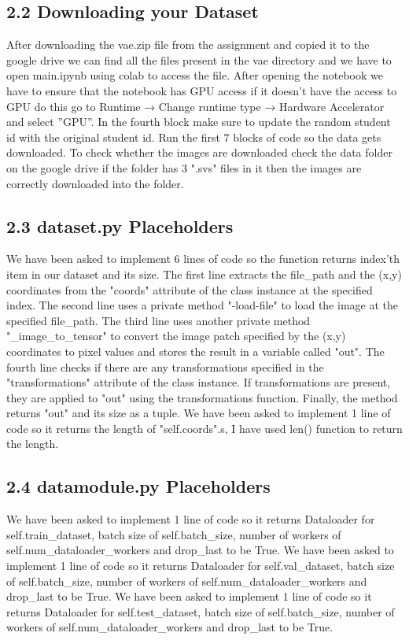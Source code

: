 \documentclass{article}
\begin{document}
    
   \subsection*{2.2 Downloading your Dataset} 
     \newline After downloading the vae.zip file from the assignment and copied it to the google drive we can find all the files present in the vae directory and we have to open main.ipynb using colab to access the file.
     After opening the notebook we have to ensure that the notebook has GPU access if it doesn't have the access to GPU do this go to Runtime → Change runtime type → Hardware Accelerator and select ”GPU”.
     In the fourth block make sure to update the random student id with the original student id. Run the first 7 blocks of code so the data gets downloaded. To check whether the images are downloaded check the data folder on the google drive if the folder has 3 ".svs" files in it then the images are correctly downloaded into the folder.
    \subsection*{2.3 dataset.py Placeholders }
     \newline We have been asked to implement 6 lines of code so the function returns index'th item in our dataset and its size.
     The first line extracts the file\_path and the (x,y) coordinates from the "coords" attribute of the class instance at the specified index.
     The second line uses a private method "-load-file" to load the image at the specified file\_path.
     The third line uses another private method "\_image\_to\_tensor" to convert the image patch specified by the (x,y) coordinates to pixel values and stores the result in a variable called "out".
     The fourth line checks if there are any transformations specified in the "transformations" attribute of the class instance. If transformations are present, they are applied to "out" using the transformations function.
     Finally, the method returns "out" and its size as a tuple.
     \newline We have been asked to implement 1 line of code so it returns the length of "self.coords".s, I have used len() function to return the length. 
      
     \subsection*{2.4 datamodule.py Placeholders } 
 \newline We have been asked to implement 1 line of code so it returns Dataloader for self.train\_dataset, batch size of self.batch\_size, number of workers of self.num\_dataloader\_workers and drop\_last to be True.
 \newline We have been asked to implement 1 line of code so it returns Dataloader for self.val\_dataset, batch size of self.batch\_size, number of workers of self.num\_dataloader\_workers and drop\_last to be True.
 \newline We have been asked to implement 1 line of code so it returns Dataloader for self.test\_dataset, batch size of self.batch\_size, number of workers of self.num\_dataloader\_workers and drop\_last to be True.
 
\end{document}
